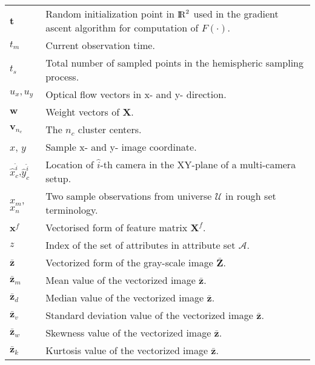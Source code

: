 \begin{longtable}[l]{p{80pt}p{320pt}}
$\mathbf{t}$ & Random initialization point in ${\rm I\!R}^{2}$ used in the gradient ascent algorithm for computation of $F(\cdot)$.\\
$t_m$ & Current observation time. \\
$t_s$ & Total number of sampled points in the hemispheric sampling process. \\
$u_x, u_y$ & Optical flow vectors in x- and y- direction. \\
$\mathbf{w}$ & Weight vectors of $\mathbf{X}$. \\
$\mathbf{v}_{n_c}$ & The $n_c$ cluster centers.\\
$x$, $y$ & Sample x- and y- image coordinate. \\
$\hat{x}^{\hat{i}}_c$,$\hat{y}^{\hat{i}}_c$	& Location of $\hat{i}$-th camera in the XY-plane of a multi-camera setup.\\
$x_m$, $x_n$ & Two sample observations from universe $\mathcal{U}$ in rough set terminology. \\
$\mathbf{x}^{f}$ & Vectorised form of feature matrix $\mathbf{X}^{f}$. \\
$z$ & Index of the set of attributes in attribute set $\mathcal{A}$. \\
$\bar{\mathbf{z}}$ & Vectorized form of the gray-scale image $\bar{\mathbf{Z}}$. \\
$\bar{\mathbf{z}}_m$ & Mean value of the vectorized image $\bar{\mathbf{z}}$.\\
$\bar{\mathbf{z}}_d$ & Median value of the vectorized image $\bar{\mathbf{z}}$.\\
$\bar{\mathbf{z}}_v$ & Standard deviation value of the vectorized image $\bar{\mathbf{z}}$.\\
$\bar{\mathbf{z}}_w$ & Skewness value of the vectorized image $\bar{\mathbf{z}}$.\\
$\bar{\mathbf{z}}_k$ & Kurtosis value of the vectorized image $\bar{\mathbf{z}}$.\\











\end{longtable}
